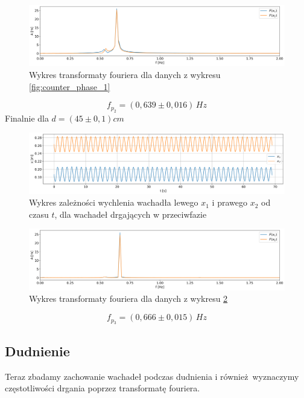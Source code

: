 \documentclass[12pt]{article}
\begin{document}
\begin{figure}[H]
    \centering
    \includegraphics[width=\linewidth]{counterphase_2_fft}
    \caption{Wykres transformaty fouriera dla danych z wykresu \ref{fig:counter_phase_1}}
    \label{fig:coutner_phase_1_fft}
\end{figure}
\[
    f_{p_2} = (0{,}639 \pm 0{,}016) \, Hz
\]
Finalnie dla \(d = (45 \pm 0{,}1) cm\)
\begin{figure}[H]
    \centering
    \includegraphics[width=\linewidth]{counterphase_3}
    \caption{Wykres zależności wychlenia wachadła lewego \(x_1\) i prawego \(x_2\) od czasu \(t\), dla wachadeł drgających w przeciwfazie}
    \label{fig:counter_phase_2}
\end{figure}
\begin{figure}[H]
    \centering
    \includegraphics[width=\linewidth]{counterphase_3_fft}
    \caption{Wykres transformaty fouriera dla danych z wykresu \ref{fig:counter_phase_2}}
    \label{fig:coutner_phase_2_fft}
\end{figure}
\[
    f_{p_3} = (0{,}666 \pm 0{,}015) \, Hz
\]


\subsection{Dudnienie}
Teraz zbadamy zachowanie wachadeł podczas dudnienia i również wyznaczymy częstotliwości drgania poprzez transformatę fouriera.
\end{document}
